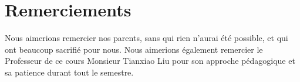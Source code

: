 \documentclass[11pt, french]{article}
\begin{document}


\tableofcontents
\listoffigures
\listoftables


\newpage
\section* {Remerciements}
Nous aimerions remercier nos parents, sans qui rien n'aurai été possible, et qui ont beaucoup sacrifié pour nous. Nous aimerions également remercier le Professeur de ce cours Monsieur Tianxiao Liu pour son approche pédagogique et sa patience durant tout le semestre.  








\newpage


\nocite{*}
\end{document}
